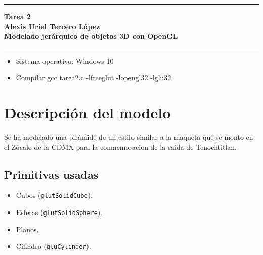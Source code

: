 \documentclass[12pt, letterpaper]{article}
\author{Alexis Tercero: alexistercero55@gamil.com}
\begin{document}


\rule{\textwidth}{1pt}
\begin{center} %
    \bfseries Tarea 2 \\ Alexis Uriel Tercero López\\Modelado jerárquico de objetos 3D con OpenGL
\end{center}
\rule{\textwidth}{1pt}

\begin{itemize}
    \item Sistema operativo: Windows 10
    \item Compilar gcc tarea2.c -lfreeglut -lopengl32 -lglu32
\end{itemize}

\section{Descripción del modelo}
Se ha modelado una pirámide de un estilo similar a la maqueta que se monto en el Zócalo de la CDMX
para la conmemoracion de la caida de Tenochtitlan.

\subsection{Primitivas usadas}
\begin{itemize}
    \item Cubos (\texttt{glutSolidCube}).
    \item Esferas (\texttt{glutSolidSphere}).
    \item Planos.
    \item Cilindro (\texttt{gluCylinder}).
\end{itemize}
\end{document}
